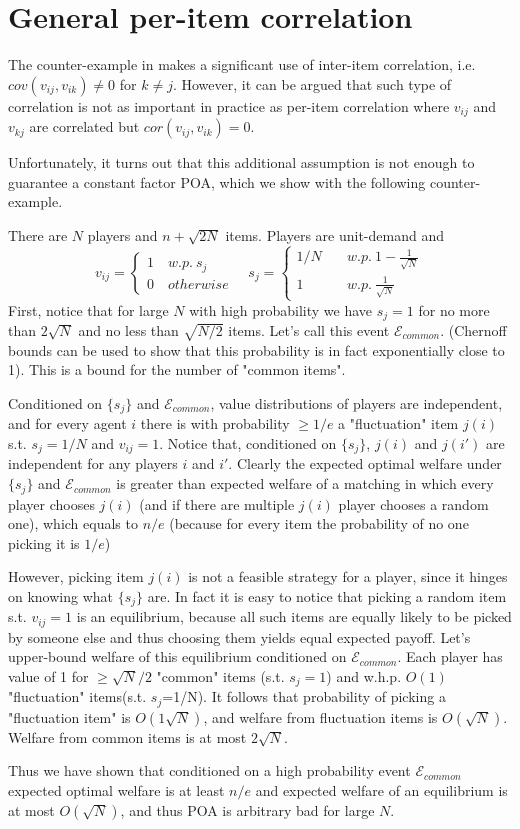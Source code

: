 \section{General per-item correlation}

The counter-example in \cite{roughgarden} makes a significant use of inter-item correlation, i.e. $cov(v_{ij},v_{ik})\neq 0$ for $k\neq j$. However, it can be argued that such type of correlation is not as important in practice as per-item correlation where $v_{ij}$ and $v_{kj}$ are correlated but $cor(v_{ij},v_{ik}) = 0$. 


Unfortunately, it turns out that this additional assumption is not enough to guarantee a constant factor POA, which we show with the following counter-example.

\begin{example}

There are $N$ players and $n+\sqrt{2N}$ items. Players are unit-demand and 
$$v_{ij} =\begin{cases} 
1\quad w.p.\ s_j\\
0\quad otherwise
\end{cases}
\quad
s_j = \begin{cases}
1/N \quad &w.p.\ 1-\frac{1}{\sqrt{N}}\\
1 \quad &w.p.\ \frac{1}{\sqrt{N}}
\end{cases}
$$
First, notice that for large $N$ with high probability we have $s_j=1$ for no more than $2\sqrt{N}$ and no less than $\sqrt{N/2}$ items. Let's call this event $\mathcal{E}_{common}$. (Chernoff bounds can be used to show that this probability is in fact exponentially close to 1). This is a bound for the number of "common items".

Conditioned on $\{s_j\}$ and $\mathcal{E}_{common}$, value distributions of players are independent, and for every agent $i$ there is with probability $\geq 1/e$ a "fluctuation" item $j(i)$ s.t. $s_j=1/N$ and $v_{ij} = 1$. Notice that, conditioned on $\{s_j\}$, $j(i)$ and $j(i')$ are independent for any players $i$ and $i'$. Clearly the expected optimal welfare under $\{s_j\}$ and $\mathcal{E}_{common}$ is greater than expected welfare of a matching in which every player chooses $j(i)$ (and if there are multiple $j(i)$ player chooses a random one), which equals to $n/e$ (because for every item the probability of no one picking it is $1/e$)

However, picking item $j(i)$ is not a feasible strategy for a player, since it hinges on knowing what $\{s_j\}$ are. In fact it is easy to notice that picking a random item s.t. $v_{ij}=1$ is an equilibrium, because all such items are equally likely to be picked by someone else and thus choosing them yields equal expected payoff. Let's upper-bound welfare of this equilibrium conditioned on $\mathcal{E}_{common}$. Each player has value of 1 for $\geq\sqrt{N}/2$  "common" items (s.t. $s_j=1$) and w.h.p. $O(1)$ "fluctuation" items(s.t. $s_j$=1/N). It follows that probability of picking a "fluctuation item" is $O(1\sqrt{N})$, and welfare from fluctuation items is $O(\sqrt{N})$. Welfare from common items is at most $2\sqrt{N}$.

Thus we have shown that conditioned on a high probability event $\mathcal{E}_{common}$ expected optimal welfare is at least $n/e$ and expected welfare of an equilibrium is at most $O(\sqrt{N})$, and thus POA is arbitrary bad for large $N$.
\end{example}